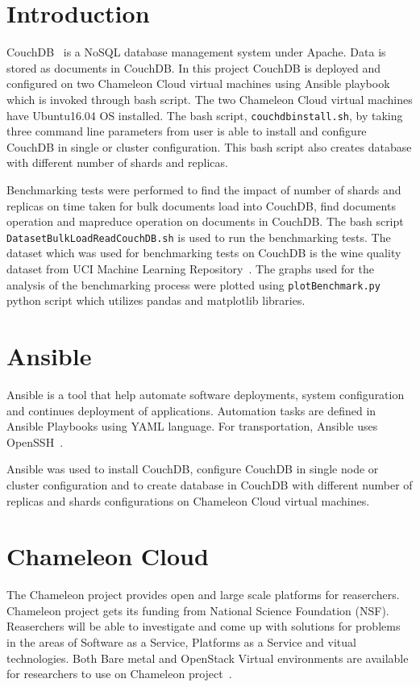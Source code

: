 \section{Introduction}

CouchDB~\cite{www-Couchdb} is a NoSQL database management system
under Apache. Data is stored as documents in CouchDB. In this project
CouchDB is deployed and configured on two Chameleon Cloud virtual machines using
Ansible playbook which is invoked through bash script. The two Chameleon
Cloud virtual machines have Ubuntu16.04 OS installed. The bash script, 
\verb|couchdbinstall.sh|, by taking three command line parameters from user is
able to install and configure CouchDB in single or cluster
configuration.  This bash script also creates database with different
number of shards and replicas. 

Benchmarking tests were performed to find the
impact of number of shards and replicas on time taken for bulk
documents load into CouchDB, find documents operation and mapreduce
operation on documents in CouchDB. The bash script \verb|DatasetBulkLoadReadCouchDB.sh| is used to run the
benchmarking tests.  The dataset which
was used for benchmarking tests on CouchDB is the wine quality dataset
from UCI Machine Learning Repository~\cite{www-WineQuality}. The
graphs used for the analysis of the benchmarking process were plotted
using \verb|plotBenchmark.py| python script which utilizes pandas and
matplotlib libraries.

\section{Ansible}
Ansible is a tool that help automate software deployments, system
configuration and continues deployment of applications. Automation
tasks are defined in Ansible Playbooks using YAML language. For
transportation, Ansible uses OpenSSH~\cite{www-Ansible}. 

Ansible was used to install CouchDB, configure
CouchDB in single node or cluster configuration and to create database
in CouchDB with different number of replicas and shards configurations on
Chameleon Cloud virtual machines.

\section{Chameleon Cloud}

The Chameleon project provides open and large scale platforms for
reaserchers. Chameleon project gets its funding from National Science
Foundation (NSF). Reaserchers will be able to investigate and come up
with solutions for problems in the areas of Software as a Service, Platforms as a
Service and vitual technologies. Both Bare metal and OpenStack Virtual
environments are available for researchers to use on Chameleon
project~\cite{www-Chameleon}. 

